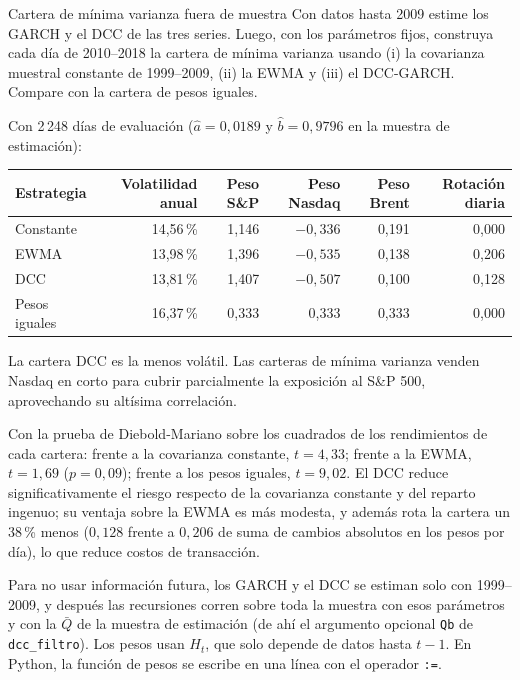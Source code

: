 \begin{ejresuelto}{Cartera de mínima varianza fuera de muestra}\label{ej:minvar}
\enunciado Con datos hasta 2009 estime los GARCH y el DCC de las tres series. Luego, con los parámetros fijos,
construya cada día de 2010--2018 la cartera de mínima varianza usando (i) la covarianza muestral constante de
1999--2009, (ii) la EWMA y (iii) el DCC-GARCH. Compare con la cartera de pesos iguales.

\solucion
{} Con 2\,248 días de evaluación ($\hat a=0{,}0189$ y $\hat b=0{,}9796$ en la muestra de
estimación):
\begin{center}\small
\begin{tabular}{@{}lrrrrr@{}}
\toprule
Estrategia & Volatilidad anual & Peso S\&P & Peso Nasdaq & Peso Brent & Rotación diaria \\
\midrule
Constante      & 14,56\,\% & 1,146 & $-0{,}336$ & 0,191 & 0,000 \\
EWMA           & 13,98\,\% & 1,396 & $-0{,}535$ & 0,138 & 0,206 \\
DCC            & 13,81\,\% & 1,407 & $-0{,}507$ & 0,100 & 0,128 \\
Pesos iguales  & 16,37\,\% & 0,333 & 0,333 & 0,333 & 0,000 \\
\bottomrule
\end{tabular}
\end{center}
La cartera DCC es la menos volátil. Las carteras de mínima varianza venden Nasdaq en corto para cubrir
parcialmente la exposición al S\&P 500, aprovechando su altísima correlación.

 Con la prueba de Diebold-Mariano sobre los cuadrados de los
rendimientos de cada cartera: frente a la covarianza constante, $t=4{,}33$; frente a la EWMA, $t=1{,}69$
($p=0{,}09$); frente a los pesos iguales, $t=9{,}02$. El DCC reduce significativamente el riesgo respecto de la
covarianza constante y del reparto ingenuo; su ventaja sobre la EWMA es más modesta, y además rota la cartera un
38\,\% menos ($0{,}128$ frente a $0{,}206$ de suma de cambios absolutos en los pesos por día), lo que reduce costos
de transacción.


\RvsPy Para no usar información futura, los GARCH y el DCC se estiman solo con 1999--2009, y después las
recursiones corren sobre toda la muestra con esos parámetros y con la $\bar Q$ de la muestra de estimación (de ahí
el argumento opcional \texttt{Qb} de \texttt{dcc\_filtro}). Los pesos usan $H_t$, que solo depende de datos hasta
$t-1$. En Python, la función de pesos se escribe en una línea con el operador \texttt{:=}.


\end{ejresuelto}
